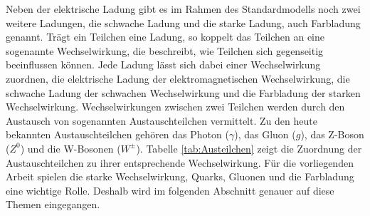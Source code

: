 \newline
Neben der elektrische Ladung gibt es im Rahmen des Standardmodells noch zwei weitere Ladungen, die schwache Ladung und die starke Ladung, auch Farbladung genannt.
Trägt ein Teilchen eine Ladung, so koppelt das Teilchen an eine sogenannte Wechselwirkung, die beschreibt, wie Teilchen sich gegenseitig beeinflussen können.
Jede Ladung lässt sich dabei einer Wechselwirkung zuordnen,
die elektrische Ladung der elektromagnetischen Wechselwirkung, die schwache Ladung der schwachen Wechselwirkung und die Farbladung der starken Wechselwirkung.
\newline
Wechselwirkungen zwischen zwei Teilchen werden durch den Austausch von sogenannten Austauschteilchen vermittelt.
Zu den heute bekannten Austauschteilchen gehören das Photon ($\gamma$), das Gluon ($g$), das Z-Boson ($Z^{0}$) und die W-Bosonen ($W^{\pm}$).
Tabelle \ref{tab:Austeilchen} zeigt die Zuordnung der Austauschteilchen zu ihrer entsprechende Wechselwirkung.
\newline
F{\"u}r die vorliegenden Arbeit spielen die starke Wechselwirkung, Quarks, Gluonen und die Farbladung eine wichtige Rolle.
Deshalb wird im folgenden Abschnitt genauer auf diese Themen eingegangen.